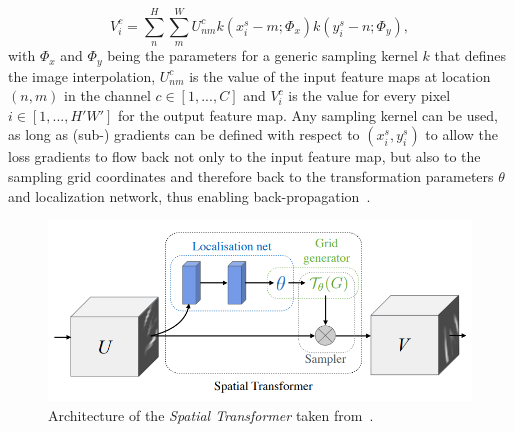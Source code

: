 \documentclass[english,version-2022-01]{uzl-thesis} %
\begin{document}
\begin{equation}
	V_i^c = \sum^{H}_{n} \sum^{W}_{m} U_{nm}^c k(x_i^s - m; \Phi_x) k(y_i^s - n; \Phi_y),
\end{equation}
with $\Phi_x$ and $\Phi_y$ being the parameters for a generic sampling  kernel $k$ that defines the image interpolation, $U_{nm}^c$ is the value of the input feature maps at location $(n,m)$ in the channel $c \in [1, ..., C]$ and $V_i^c$ is the value for every pixel $i \in [1, ..., H'W']$ for the output feature map. Any sampling kernel can be used, as long as (sub-) gradients can be defined with respect to $(x_i^s, y_i^s)$ to allow the loss gradients to flow back not only to the input feature map, but also to the sampling grid coordinates and therefore back to the transformation parameters $\theta$ and localization network, thus enabling back-propagation~\cite{SpatialTransformer}.
\begin{figure}[htpb]
	\centering
	\graphicspath{{images/}{\main/images/}}
	\includegraphics[width=\linewidth]{SpatialTransformer.png} 
	\caption{Architecture of the \emph{Spatial Transformer} taken from~\cite{SpatialTransformer}.}
	\label{fig:SpatialTransformer}
\end{figure}
\end{document}

